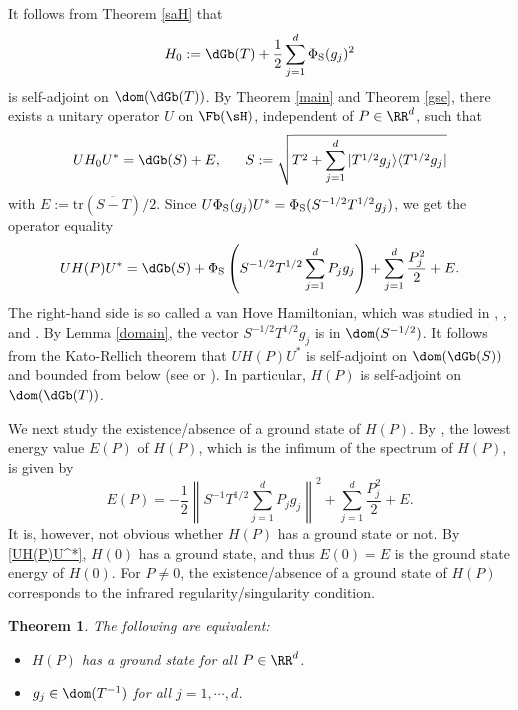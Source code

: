 \documentclass[12pt]{article}
\theoremstyle{plain}
\newtheorem{thm}[theorem]{\bf Theorem}
\numberwithin{equation}{section}
\theoremstyle{remark}
\begin{document}
It follows from Theorem \ref{saH} that 
\[
  H_0 := \dGb(T) + \frac{1}{2}\sum_{j=1}^{d}\Phi_{\rm S}(g_j)^2
\]
is self-adjoint on $\dom(\dGb(T))$.
By Theorem \ref{main} and Theorem \ref{gse}, there exists a unitary operator $U$ on $\Fb(\sH)$,
independent of $P\in\RR^d$, such that
\[
  UH_0U^* = \dGb(S) + E, \ \ \ \ \ S:=\sqrt{T^2+\sum_{j=1}^d|T^{1/2}g_j\rangle\langle T^{1/2}g_j|}
\]
with $E:=\mathrm{tr}(\overline{S-T})/2$.
Since $U\Phi_{\rm S}(g_j)U^*=\Phi_{\rm S}(S^{-1/2}T^{1/2}g_j)$, we get the operator equality
\begin{equation}\label{UH(P)U^*}
UH(P)U^{*} = \dGb(S) +\Phi_{\rm S}\left(S^{-1/2}T^{1/2}\sum_{j=1}^{d} P_jg_j\right)+\sum_{j=1}^{d}\frac{P_j^2}{2} +E.
\end{equation}
The right-hand side is so called a van Hove Hamiltonian, which was studied in 
\cite[Chapter 12]{A00}, \cite[Chapter 13]{A18}, \cite{De03} and \cite[Section 11.6]{DG13}.
By Lemma \ref{domain}, the vector $S^{-1/2}T^{1/2}g_j$ is in $\dom(S^{-1/2})$.
It follows from the Kato-Rellich theorem that $UH(P)U^{*}$ is self-adjoint on $\dom(\dGb(S))$ 
and bounded from below (see \cite[Theorem 13.1]{A18} or \cite[Proposition 3.13]{De03}). %
In particular, $H(P)$ is self-adjoint on $\dom(\dGb(T))$.

We next study the existence/absence of a ground state of $H(P)$.
By \cite[Theorem 13.5]{A18}, the lowest energy value $E(P)$ of $H(P)$, which is the infimum of the spectrum of $H(P)$, is given by
\[
E(P) = -\frac{1}{2} \left\|S^{-1}T^{1/2}\sum_{j=1}^dP_jg_j\right\|^2 + \sum_{j=1}^d\frac{P_j^2}{2} + E.
\]
It is, however, not obvious whether $H(P)$ has a ground state or not.
By \eqref{UH(P)U^*}, $H(0)$ has a ground state, and thus $E(0)=E$ is the ground state energy of $H(0)$.
For $P\not=0$, the existence/absence of a ground state of $H(P)$ corresponds to the infrared regularity/singularity condition.

\begin{thm}\label{e/a gs}
The following are equivalent:
\begin{itemize}{}{}
\item[(1)] $H(P)$ has a ground state for all $P\in\RR^d$.
\item[(2)] $g_j\in\dom(T^{-1})$ for all $j=1,\cdots,d$.
\end{itemize}
\end{thm}
\end{document}
